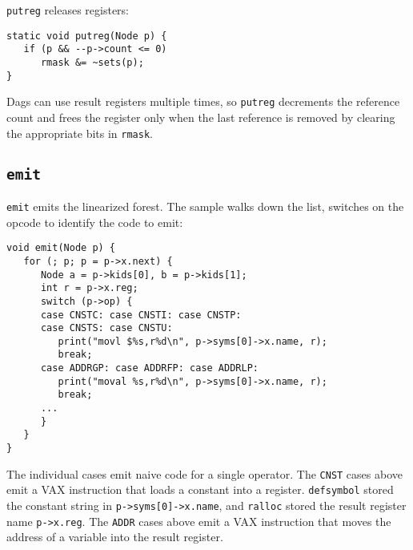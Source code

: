 \verb|putreg| releases registers:
\begin{verbatim}
static void putreg(Node p) {
   if (p && --p->count <= 0)
      rmask &= ~sets(p);
}
\end{verbatim}
Dags can use result registers multiple times, so \verb|putreg|
decrements the reference count and frees the register only when the
last reference is removed by clearing the appropriate bits in
\verb|rmask|.

\subsection{\tt emit}

\label{emit}
\verb|emit| emits the linearized forest. The sample walks down the list,
switches on the opcode to identify the code to emit:
\begin{verbatim}
void emit(Node p) {
   for (; p; p = p->x.next) {
      Node a = p->kids[0], b = p->kids[1];
      int r = p->x.reg;
      switch (p->op) {
      case CNSTC: case CNSTI: case CNSTP:
      case CNSTS: case CNSTU:
         print("movl $%s,r%d\n", p->syms[0]->x.name, r);
         break;
      case ADDRGP: case ADDRFP: case ADDRLP:
         print("moval %s,r%d\n", p->syms[0]->x.name, r);
         break;
      ...
      }
   }
}
\end{verbatim}
The individual cases emit naive code for a single operator.
The \verb|CNST| cases above emit a VAX instruction that loads a constant
into a register. \verb|defsymbol| stored the constant string in
\verb|p->syms[0]->x.name|, and \verb|ralloc| stored the result register
name \verb|p->x.reg|. The \verb|ADDR| cases above emit a VAX
instruction that moves the address of a variable into the result
register.

